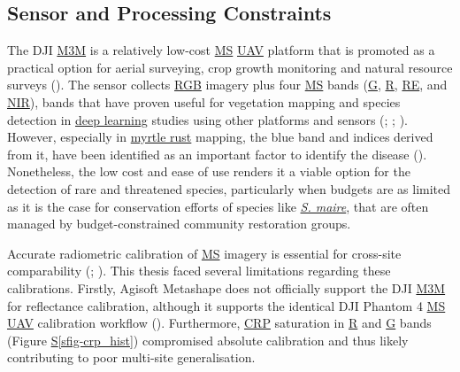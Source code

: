 \documentclass[
]{scrreprt}
\newcommand*\quartosfigref[1]{Figure \hyperref[#1]{S\ref{#1}}}
\begin{document}
\subsection{Sensor and Processing Constraints}\label{sec-calibration}

The DJI \hyperref[acronyms_M3M]{M3M} is a relatively low-cost
\hyperref[acronyms_MS]{MS} \hyperref[acronyms_UAV]{UAV} platform that is
promoted as a practical option for aerial surveying, crop growth
monitoring and natural resource surveys (). The sensor collects \hyperref[acronyms_RGB]{RGB} imagery plus
four \hyperref[acronyms_MS]{MS} bands (\hyperref[acronyms_G]{G},
\hyperref[acronyms_R]{R}, \hyperref[acronyms_RE]{RE}, and
\hyperref[acronyms_NIR]{NIR}), bands that have proven useful for
vegetation mapping and species detection in \hyperref[acronyms_DL]{deep
learning} studies using other platforms and sensors
(;
;
).
However, especially in \hyperref[acronyms_MR]{myrtle rust} mapping, the
blue band and indices derived from it, have been identified as an
important factor to identify the disease
().
Nonetheless, the low cost and ease of use renders it a viable option for
the detection of rare and threatened species, particularly when budgets
are as limited as it is the case for conservation efforts of species
like \hyperref[acronyms_SM]{\emph{S. maire}}, that are often managed by
budget-constrained community restoration groups.

Accurate radiometric calibration of \hyperref[acronyms_MS]{MS} imagery
is essential for cross-site comparability
(;
). This thesis faced several limitations regarding these
calibrations. Firstly, Agisoft Metashape does not officially support the
DJI \hyperref[acronyms_M3M]{M3M} for reflectance calibration, although
it supports the identical DJI Phantom 4 \hyperref[acronyms_MS]{MS}
\hyperref[acronyms_UAV]{UAV} calibration workflow
().
Furthermore, \hyperref[acronyms_CRP]{CRP} saturation in
\hyperref[acronyms_R]{R} and \hyperref[acronyms_G]{G} bands
(\quartosfigref{sfig-crp_hist}) compromised absolute calibration and
thus likely contributing to poor multi-site generalisation.
\end{document}
